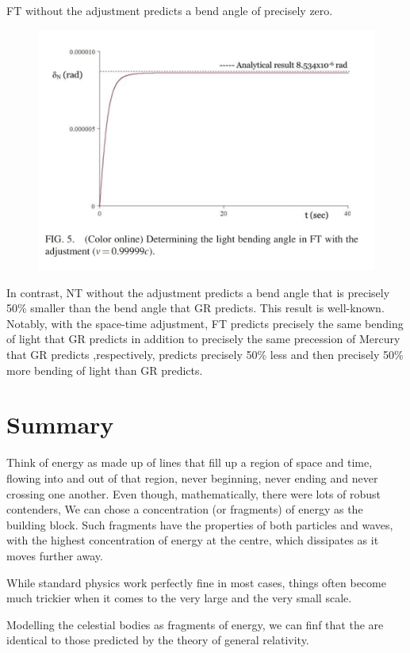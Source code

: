 \documentclass[12pt]{article}
\begin{document}
FT without the adjustment predicts
a bend angle of precisely zero.
\begin{figure}[htbp]
    \includegraphics[width=0.6\linewidth]{IMG_20210218_183705.jpg}
\end{figure}
In contrast, NT without the
adjustment predicts a bend angle that is precisely 50\%
smaller than the bend angle that GR predicts. This result is
well-known.
Notably, with the space-time adjustment, FT
predicts precisely the same bending of light that GR predicts
in addition to precisely the same precession of Mercury that
GR predicts ,respectively, predicts precisely 50\% less and then precisely
50\% more bending of light than GR predicts. \\

\section{Summary}
Think of energy as made up of lines that fill up a region of space and time,
flowing into and out of that region, never beginning,
never ending and never crossing one another.
Even though, mathematically, there were lots of robust contenders,
We can chose a concentration (or fragments) of energy as the building block.
Such fragments have the properties of both particles and waves, with the highest concentration of energy at the centre,
which dissipates as it moves further away.

While standard physics work perfectly fine in most cases,
things often become much trickier when it comes to the very large and the very small scale.

Modelling the celestial bodies as fragments of energy, we can finf
that the are identical to those predicted by the theory of general relativity.
\end{document}
